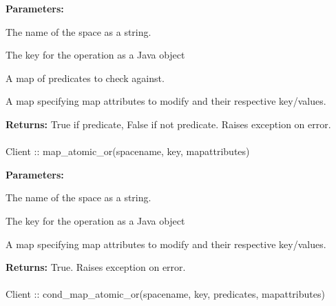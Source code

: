 \noindent\textbf{Parameters:}
\begin{description}[labelindent=\widthof{{\code{mapattributes}}},leftmargin=*,noitemsep,nolistsep,align=right]
\item[\code{spacename}] The name of the space as a string.
\item[\code{key}] The key for the operation as a Java object
\item[\code{predicates}] A map of predicates to check against.
\item[\code{mapattributes}] A map specifying map attributes to modify and their respective key/values.
\end{description}

\noindent\textbf{Returns:}
True if predicate, False if not predicate.  Raises exception on error.

\paragraph{}
\label{api:java:map_atomic_or}
\begin{javacode}
Client :: map_atomic_or(spacename, key, mapattributes)
\end{javacode}
\funcdesc 

\noindent\textbf{Parameters:}
\begin{description}[labelindent=\widthof{{\code{mapattributes}}},leftmargin=*,noitemsep,nolistsep,align=right]
\item[\code{spacename}] The name of the space as a string.
\item[\code{key}] The key for the operation as a Java object
\item[\code{mapattributes}] A map specifying map attributes to modify and their respective key/values.
\end{description}

\noindent\textbf{Returns:}
True.  Raises exception on error.

\paragraph{}
\label{api:java:cond_map_atomic_or}
\begin{javacode}
Client :: cond_map_atomic_or(spacename, key, predicates, mapattributes)
\end{javacode}
\funcdesc 

